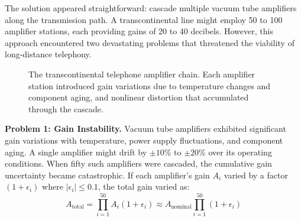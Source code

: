 The solution appeared straightforward: cascade multiple vacuum tube amplifiers along the transmission path. A transcontinental line might employ 50 to 100 amplifier stations, each providing gains of 20 to 40 decibels. However, this approach encountered two devastating problems that threatened the viability of long-distance telephony.

\begin{figure}[htbp]
\centering
{}
\caption{The transcontinental telephone amplifier chain. Each amplifier station introduced gain variations due to temperature changes and component aging, and nonlinear distortion that accumulated through the cascade.}
\label{fig:telephone_chain}
\end{figure}

\textbf{Problem 1: Gain Instability.} Vacuum tube amplifiers exhibited significant gain variations with temperature, power supply fluctuations, and component aging. A single amplifier might drift by $\pm 10\%$ to $\pm 20\%$ over its operating conditions. When fifty such amplifiers were cascaded, the cumulative gain uncertainty became catastrophic. If each amplifier's gain $A_i$ varied by a factor $(1 + \epsilon_i)$ where $|\epsilon_i| \leq 0.1$, the total gain varied as:
\begin{equation}
A_{\text{total}} = \prod_{i=1}^{50} A_i(1 + \epsilon_i) \approx A_{\text{nominal}} \prod_{i=1}^{50}(1 + \epsilon_i)
\end{equation}

